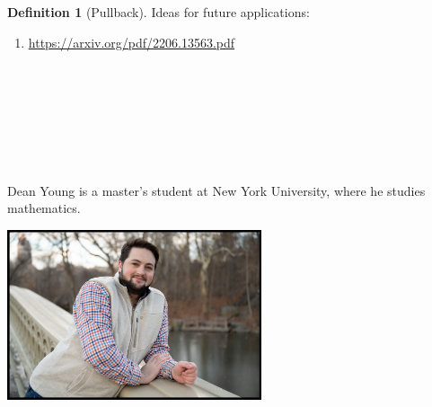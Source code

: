 \documentclass{book}
\theoremstyle{definition}
\newtheorem{definition}{Definition}
\newcounter{lcounter}
\begin{document}
\begin{definition}[Pullback]

Ideas for future applications:

\begin{enumerate}
\item \url{https://arxiv.org/pdf/2206.13563.pdf}
\end{enumerate}

\newpage 
\ \\
\ \\
\ \\
\ \\
\ \\
\ \\
\begin{center}
\begin{tcolorbox}[width=5in,colback={white},title={\begin{center}\texttt{About the Author} \addtocounter{lcounter}{1}  \end{center}},colbacktitle=Yellow,coltitle=black]
Dean Young is a master's student at New York University, where he studies mathematics. \\
\begin{center}
\includegraphics[width=7.5cm,height=5cm]{about.jpg}
\end{center}
\end{tcolorbox}
\end{center}


\end{definition}
\end{document}

